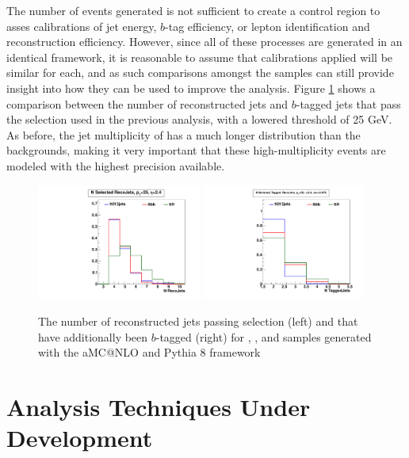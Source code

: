 \noindent The number of events generated is not sufficient to create a
control region to asses calibrations of jet energy, $b$-tag
efficiency, or lepton identification and reconstruction efficiency.
However, since all of these processes are generated in an identical
framework, it is reasonable to assume that calibrations applied will
be similar for each, and as such comparisons amongst the samples can
still provide insight into how they can be used to improve the
analysis.  Figure \ref{fig:aMCatNLO_nJets_nTags} shows a comparison
between the number of reconstructed jets and $b$-tagged jets that pass
the selection used in the previous analysis, with a lowered \PT
threshold of 25 GeV.  As before, the jet multiplicity of \ttH has a
much longer distribution than the \ttjets backgrounds, making it very
important that these high-multiplicity events are modeled with the
highest precision available.  

\begin{figure}[hbtp] 
  {\centering
    \includegraphics[width=0.48\textwidth]{Figures/Analysis_Improvement_Diagrams/tt012jets_ttbb_ttH__h_recoJet_nRecoJets__unitNorm.pdf}
    \includegraphics[width=0.48\textwidth]{Figures/Analysis_Improvement_Diagrams/tt012jets_ttbb_ttH__h_recoJet_nRecoTaggedJets__unitNorm.pdf}
    \caption{The number of reconstructed jets passing selection (left)
    and that have additionally been $b$-tagged (right) for \ttH,
    \ttjets, and \ttbb samples generated with the aMC@NLO and Pythia 8
  framework}
    \label{fig:aMCatNLO_nJets_nTags}}
\end{figure}

\section{Analysis Techniques Under Development}
\label{analysis_techniques_overview}


